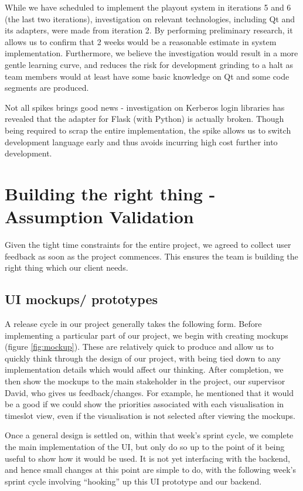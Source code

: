 \documentclass[a4paper]{article}
\begin{document}
While we have scheduled to implement the playout system in iterations 5 and 6
(the last two iterations),
investigation on relevant technologies, including Qt and its adapters, were
made from iteration 2. By performing preliminary research, it allows 
us to confirm that 2 weeks would be a reasonable estimate in system 
implementation. Furthermore, we believe the investigation would result 
in a more gentle learning curve, and reduces the risk for development 
grinding to a halt as team members would
at least have some basic knowledge on Qt and some code segments are produced.

Not all spikes brings good news - investigation on Kerberos login libraries has
revealed that the adapter for Flask (with Python) is actually broken.
Though being required to scrap the entire implementation, the spike allows us
to switch development language early and thus avoids incurring high 
cost further into development.


\section{Building the right thing - Assumption Validation} \label{sec:validation}
Given the tight time constraints for the entire project, we agreed to collect
user feedback as soon as the project commences. This ensures the team
is building the right thing which our client needs.

\subsection{UI mockups/ prototypes} \label{sec:uimockup}
A release cycle in our project generally takes the following form. Before
implementing a particular part of our project, we begin with creating
mockups (figure \ref{fig:mockup}). These are relatively quick to produce
and allow us to quickly think through the design of our project,
with being tied down to any implementation details which would affect
our thinking. After completion, we then show the mockups to the main
stakeholder in the project, our supervisor David, who gives us
feedback/changes. For example, he mentioned that it would be a good if we could 
show the priorities associated with each visualisation in timeslot view, 
even if the visualisation is not selected after viewing the mockups.


Once a general design is settled on, within that week's
sprint cycle, we complete the main implementation of the UI, but only do 
so up to the point of it being useful to show how it would be used. It is
not yet interfacing with the backend, and hence small changes at this 
point are simple to do, with the following week's sprint cycle involving
``hooking'' up this UI prototype and our backend.
\end{document}
